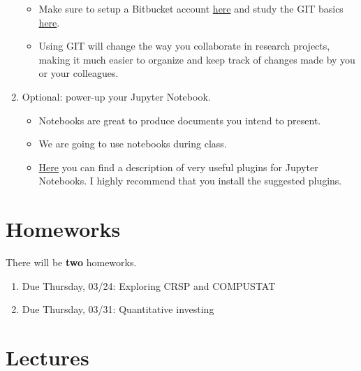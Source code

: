 \documentclass[12pts]{article}
\begin{document}
\begin{enumerate}
\begin{itemize}
		\item Make sure to setup a Bitbucket account \href{https://bitbucket.org/account/signup/}{here} and study the GIT basics \href{https://www.atlassian.com/git/tutorials/what-is-version-control}{here}.
		\item Using GIT will change the way you collaborate in research projects, making it much easier to organize and keep track of changes made by you or your colleagues.
	\end{itemize}
	\item Optional: power-up your Jupyter Notebook.
	\begin{itemize}
		\item Notebooks are great to produce documents you intend to present.
		\item We are going to use notebooks during class.
		\item \href{https://towardsdatascience.com/bringing-the-best-out-of-jupyter-notebooks-for-data-science-f0871519ca29}{Here} you can find a description of very useful plugins for Jupyter Notebooks. I highly recommend that you install the suggested plugins.  
	\end{itemize}	
\end{enumerate}

\section*{Homeworks}
There will be \textbf{two} homeworks.
\begin{enumerate}
	\item Due Thursday, 03/24: Exploring CRSP and COMPUSTAT
	\item Due Thursday, 03/31: Quantitative investing
\end{enumerate}

\section*{Lectures}
\end{document}
